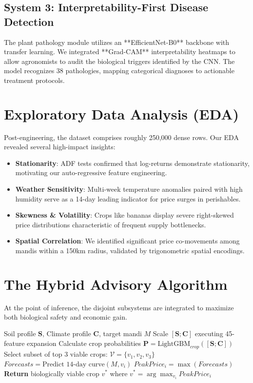 \documentclass[conference]{IEEEtran}
\begin{document}
\subsection{System 3: Interpretability-First Disease Detection}
The plant pathology module utilizes an **EfficientNet-B0** backbone with transfer learning. We integrated **Grad-CAM** interpretability heatmaps to allow agronomists to audit the biological triggers identified by the CNN. The model recognizes 38 pathologies, mapping categorical diagnoses to actionable treatment protocols.

\section{Exploratory Data Analysis (EDA)}

Post-engineering, the dataset comprises roughly 250,000 dense rows. Our EDA revealed several high-impact insights:

\begin{itemize}
    \item \textbf{Stationarity}: ADF tests confirmed that log-returns demonstrate stationarity, motivating our auto-regressive feature engineering.
    \item \textbf{Weather Sensitivity}: Multi-week temperature anomalies paired with high humidity serve as a 14-day leading indicator for price surges in perishables.
    \item \textbf{Skewness \& Volatility}: Crops like bananas display severe right-skewed price distributions characteristic of frequent supply bottlenecks.
    \item \textbf{Spatial Correlation}: We identified significant price co-movements among mandis within a 150km radius, validated by trigonometric spatial encodings.
\end{itemize}

\section{The Hybrid Advisory Algorithm}
At the point of inference, the disjoint subsystems are integrated to maximize both biological safety and economic gain.

\begin{algorithm}[H]
\caption{Hybrid Profit-Maximizing Recommender}
\begin{algorithmic}[1]
\REQUIRE Soil profile $\mathbf{S}$, Climate profile $\mathbf{C}$, target mandi $M$
\STATE Scale $[\mathbf{S}; \mathbf{C}]$ executing 45-feature expansion
\STATE Calculate crop probabilities $\mathbf{P} = \text{LightGBM}_{crop}([\mathbf{S}; \mathbf{C}])$
\STATE Select subset of top 3 viable crops: $\mathcal{V} = \{v_1, v_2, v_3\}$
    \STATE $Forecasts = \text{Predict 14-day curve}(M, v_i)$
    \STATE $PeakPrice_i = \max(Forecasts)$
\ENDFOR
\STATE \textbf{Return} biologically viable crop $v^*$ where $v^* = \arg\max_{v_i} PeakPrice_i$
\end{algorithmic}
\end{algorithm}
\end{document}
